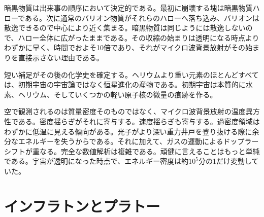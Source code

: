 暗黒物質は出来事の順序において決定的である。最初に崩壊する塊は暗黒物質ハローである。次に通常のバリオン物質がそれらのハローへ落ち込み、バリオンは散逸できるので中心により近く集まる。暗黒物質は同じようには散逸しないので、ハロー全体に広がったままである。その収縮の始まりは透明になる時点よりわずかに早く、時間でおよそ10倍であり、それがマイクロ波背景放射がその始まりを直接示さない理由である。

短い補足がその後の化学史を確定する。ヘリウムより重い元素のほとんどすべては、初期宇宙の宇宙論ではなく恒星進化の産物である。初期宇宙は本質的に水素、ヘリウム、そしていくつかの軽い原子核の微量の痕跡を作る。

空で観測されるのは質量密度そのものではなく、マイクロ波背景放射の温度異方性である。密度揺らぎがそれに寄与する。速度揺らぎも寄与する。過密度領域はわずかに低温に見える傾向がある。光子がより深い重力井戸を登り抜ける際に余分なエネルギーを失うからである。それに加えて、ガスの運動によるドップラーシフトが重なる。完全な数値解析は複雑である。頑健に言えることはもっと単純である。宇宙が透明になった時点で、エネルギー密度は約\(10^5\)分の1だけ変動していた。

\begin{classroomqa}
\end{classroomqa}

\begin{classroomqa}
\end{classroomqa}

\begin{classroomqa}
\end{classroomqa}

\section{インフラトンとプラトー}

